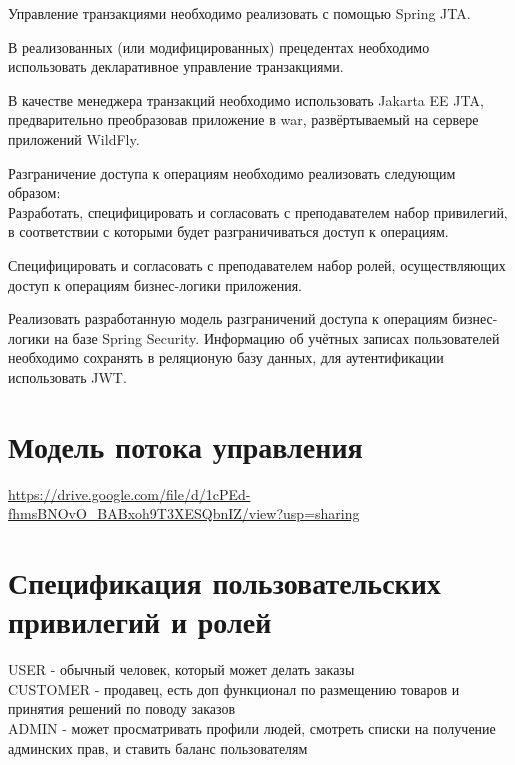 \documentclass{article}
\begin{document}
Управление транзакциями необходимо реализовать с помощью Spring JTA.

В реализованных (или модифицированных) прецедентах необходимо использовать декларативное управление транзакциями.

В качестве менеджера транзакций необходимо использовать Jakarta EE JTA, предварительно преобразовав приложение в war, развёртываемый на сервере приложений WildFly.

Разграничение доступа к операциям необходимо реализовать следующим образом:
\\
Разработать, специфицировать и согласовать с преподавателем набор привилегий, в соответствии с которыми будет разграничиваться доступ к операциям.

Специфицировать и согласовать с преподавателем набор ролей, осуществляющих доступ к операциям бизнес-логики приложения.

Реализовать разработанную модель разграничений доступа к операциям бизнес-логики на базе Spring Security. Информацию об учётных записах пользователей необходимо сохранять в реляционую базу данных, для аутентификации использовать JWT.

\section*{Модель потока управления}
\url{https://drive.google.com/file/d/1cPEd-fhmsBNOvO_BABxoh9T3XESQbnIZ/view?usp=sharing}

\section*{Спецификация пользовательских привилегий и ролей}
USER - обычный человек, который может делать заказы\\
CUSTOMER - продавец, есть доп функционал по размещению товаров и принятия решений по поводу заказов
\\ADMIN - может просматривать профили людей, смотреть списки на получение админских прав, и ставить баланс пользователям
\end{document}
